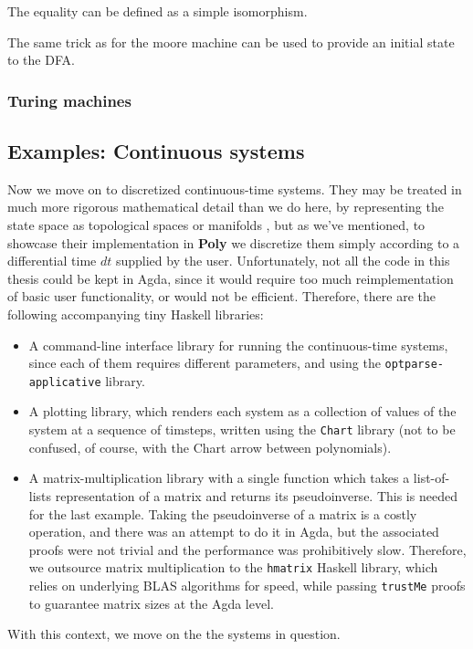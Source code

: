 The equality can be defined as a simple isomorphism.

The same trick as for the moore machine can be used to provide an initial state to the DFA.


\subsubsection{Turing machines}



\subsection{Examples: Continuous systems}
Now we move on to discretized continuous-time systems. They may be treated in much more rigorous mathematical detail than we do here, by representing the state space as topological spaces or manifolds \cite{css}, but as we've mentioned, to showcase their implementation in \textbf{Poly} we discretize them simply according to a differential time $dt$ supplied by the user.
Unfortunately, not all the code in this thesis could be kept in Agda, since it would require too much reimplementation of basic user functionality, or would not be efficient. Therefore, there are the following accompanying tiny Haskell libraries:
\begin{itemize}
    \item A command-line interface library for running the continuous-time systems, since each of them requires different parameters, and using the \texttt{optparse-applicative}\cite{optparse} library.
    \item A plotting library, which renders each system as a collection of values of the system at a sequence of timsteps, written using the \texttt{Chart}\cite{chart-lib} library (not to be confused, of course, with the Chart arrow between polynomials).
    \item A matrix-multiplication library with a single function which takes a list-of-lists representation of a matrix and returns its pseudoinverse. This is needed for the last example. Taking the pseudoinverse of a matrix is a costly operation, and there was an attempt to do it in Agda, but the associated proofs were not trivial and the performance was prohibitively slow. Therefore, we outsource matrix multiplication to the \texttt{hmatrix}\cite{hmatrix} Haskell library, which relies on underlying BLAS \cite{blas} algorithms for speed, while passing \texttt{trustMe} proofs to guarantee matrix sizes at the Agda level.
\end{itemize}
With this context, we move on the the systems in question.


